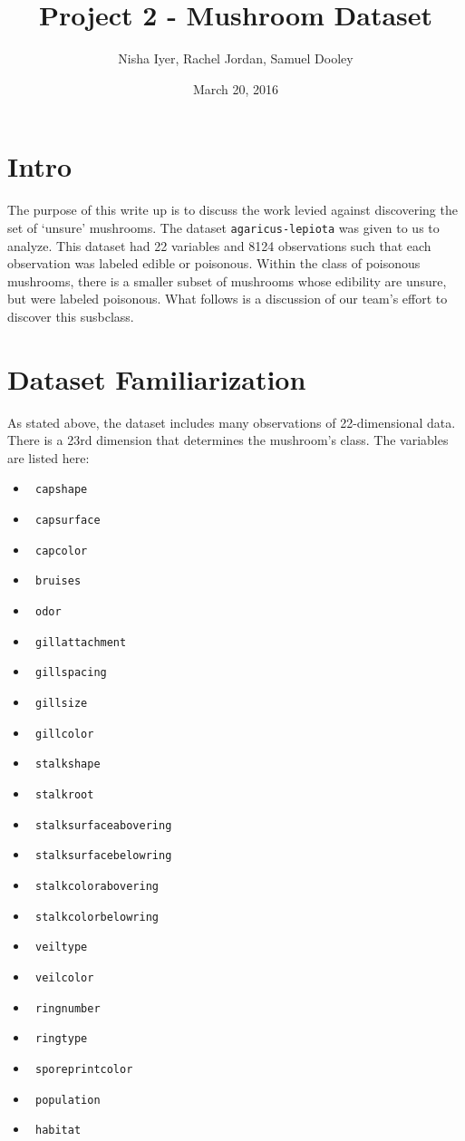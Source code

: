 \documentclass{article}
\title{Project 2 - Mushroom Dataset}
\author{Nisha Iyer, Rachel Jordan, Samuel Dooley}
\date{March 20, 2016}
\begin{document}
\maketitle

\section{Intro}

The purpose of this write up is to discuss the work levied against discovering the set of `unsure' mushrooms. The dataset \texttt{agaricus-lepiota} was given to us to analyze. This dataset had 22 variables and 8124 observations such that each observation was labeled edible or poisonous. Within the class of poisonous mushrooms, there is a smaller subset of mushrooms whose edibility are unsure, but were labeled poisonous. What follows is a discussion of our team's effort to discover this susbclass. 

\section{Dataset Familiarization}

As stated above, the dataset includes many observations of 22-dimensional data. There is a 23rd dimension that determines the mushroom's class. The variables are listed here:

 \begin{multicols}{3}
\begin{itemize}
    \item \texttt{ capshape }
    \item \texttt{ capsurface }
    \item \texttt{ capcolor }
    \item \texttt{ bruises }
    \item \texttt{ odor }
    \item \texttt{ gillattachment }
    \item \texttt{ gillspacing }
    \item \texttt{ gillsize }
    \item \texttt{ gillcolor }
    \item \texttt{ stalkshape }
    \item \texttt{ stalkroot }
    \item \texttt{ stalksurfaceabovering }
    \item \texttt{ stalksurfacebelowring }
    \item \texttt{ stalkcolorabovering }
    \item \texttt{ stalkcolorbelowring }
    \item \texttt{ veiltype }
    \item \texttt{ veilcolor }
    \item \texttt{ ringnumber }
    \item \texttt{ ringtype }
    \item \texttt{ sporeprintcolor }
    \item \texttt{ population }
    \item \texttt{ habitat }
\end{itemize}
\end{multicols}
\end{document}
